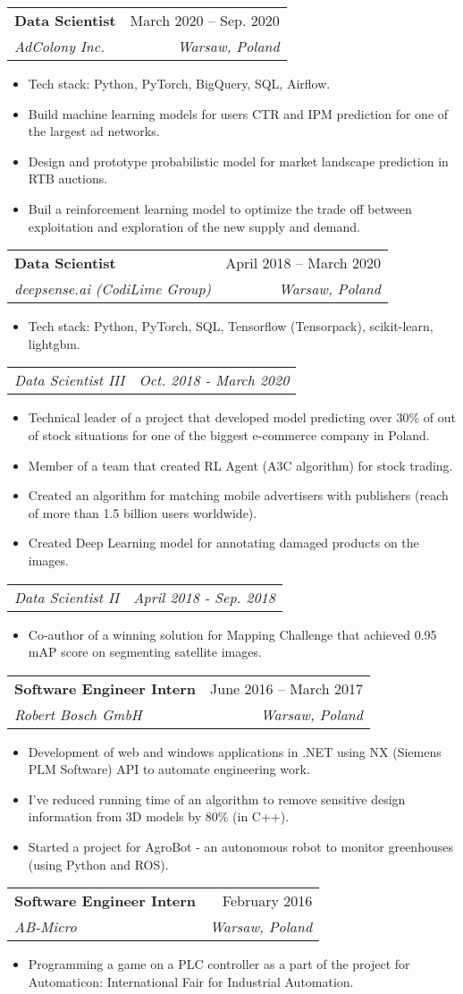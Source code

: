 \documentclass[letterpaper,11pt]{article}
\makeatletter
\newcommand{\resumeItem}[1]{
  \item\small{
    {#1 \vspace{-2pt}}
  }
}
\newcommand{\resumeSubheading}[4]{
  \vspace{-2pt}\item
    \begin{tabular*}{0.97\textwidth}[t]{l@{\extracolsep{\fill}}r}
      \textbf{#1} & #2 \\
      \textit{\small#3} & \textit{\small #4} \\
    \end{tabular*}\vspace{-7pt}
}
\newcommand{\resumeSubSubheading}[2]{
    \item
    \begin{tabular*}{0.97\textwidth}{l@{\extracolsep{\fill}}r}
      \textit{\small#1} & \textit{\small #2} \\
    \end{tabular*}\vspace{-7pt}
}
\newcommand{\resumeItemListStart}{\begin{itemize}}
\newcommand{\resumeItemListEnd}{\end{itemize}\vspace{-5pt}}
\makeatother
\begin{document}
    \resumeSubheading
      {Data Scientist}{March 2020 -- Sep. 2020}
      {AdColony Inc.}{Warsaw, Poland}
      \resumeItemListStart
        \resumeItem{Tech stack: Python, PyTorch, BigQuery, SQL, Airflow.}
        \resumeItem{Build machine learning models for users CTR and IPM prediction for one of the largest ad networks.}
        \resumeItem{Design and prototype probabilistic model for market landscape prediction in RTB auctions.}
        \resumeItem{Buil a reinforcement learning model to optimize the trade off between exploitation and exploration of the new supply and demand.}
    \resumeItemListEnd

    \resumeSubheading
      {Data Scientist}{April 2018 -- March 2020}
      {deepsense.ai (CodiLime Group)}{Warsaw, Poland}
      \resumeItemListStart
        \resumeItem{Tech stack: Python, PyTorch, SQL, Tensorflow (Tensorpack), scikit-learn, lightgbm.}
    \resumeItemListEnd
    \resumeSubSubheading
    {Data Scientist III}{Oct. 2018 - March 2020}
      \resumeItemListStart
        \resumeItem{Technical leader of a project that developed model predicting over 30\% of out of stock situations for one of the biggest e-commerce company in Poland.}
        \resumeItem{Member of a team that created RL Agent (A3C algorithm) for stock trading.}
        \resumeItem{Created an algorithm for matching mobile advertisers with publishers (reach of more than 1.5 billion users worldwide).}
        \resumeItem{Created Deep Learning model for annotating damaged products on the images.}
      \resumeItemListEnd
      
    \resumeSubSubheading
    {Data Scientist II}{April 2018 - Sep. 2018}
        \resumeItemListStart
            \resumeItem{Co-author of a winning solution for Mapping Challenge that achieved 0.95 mAP score on segmenting satellite images.}
        \resumeItemListEnd

    \resumeSubheading
      {Software Engineer Intern}{June 2016 -- March 2017}
      {Robert Bosch GmbH}{Warsaw, Poland}
      \resumeItemListStart
        \resumeItem{Development of web and windows applications in .NET using NX (Siemens PLM Software) API to automate engineering work.}
        \resumeItem{I've reduced running time of an algorithm to remove sensitive design information from 3D models by 80\% (in C++).}
        \resumeItem{Started a project for AgroBot - an autonomous robot to monitor greenhouses (using Python and ROS).}
      \resumeItemListEnd

    \resumeSubheading
      {Software Engineer Intern}{February 2016}
      {AB-Micro}{Warsaw, Poland}
      \resumeItemListStart
        \resumeItem{Programming a game on a PLC controller as a part of the project for Automaticon: International Fair for Industrial Automation.}
      \resumeItemListEnd
\end{document}
